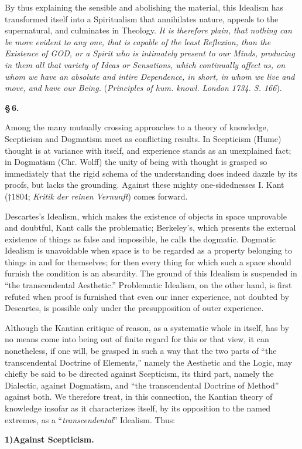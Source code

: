 \documentclass[12pt]{book}
\begin{document}
By thus explaining the sensible and abolishing the material, this Idealism has
transformed itself into a Spiritualism that annihilates nature, appeals to the
supernatural, and culminates in Theology. \textit{It is therefore plain, that
nothing can be more evident to any one, that is capable of the least Reflexion,
than the Existence of GOD, or a Spirit who is intimately present to our Minds,
producing in them all that variety of Ideas or Sensations, which continually
affect us, on whom we have an absolute and intire Dependence, in short, in whom we
live and move, and have our Being.} (\textit{Principles of hum. knowl. London
1734. S. 166}).
\begin{center}{\bfseries \S\,6.}\end{center}

Among the many mutually crossing approaches to a theory of knowledge, Scepticism
and Dogmatism meet as conflicting results. In Scepticism (Hume) thought is at
variance with itself, and experience stands as an unexplained fact; in Dogmatism
(Chr. Wolff) the unity of being with thought is grasped so immediately that the
rigid schema of the understanding does indeed dazzle by its proofs, but lacks the
grounding. Against these mighty one-sidednesses I. Kant (†1804; \textit{Kritik der
reinen Vernunft}) comes forward.

Descartes's Idealism, which makes the existence of objects in space unprovable and
doubtful, Kant calls the problematic; Berkeley's, which presents the external
existence of things as false and impossible, he calls the dogmatic. Dogmatic
Idealism is unavoidable when space is to be regarded as a property belonging to
things in and for themselves; for then every thing for which such a space should
furnish the condition is an absurdity. The ground of this Idealism is suspended in
``the transcendental Aesthetic.'' Problematic Idealism, on the other hand, is
first refuted when proof is furnished that even our inner experience, not doubted
by Descartes, is possible only under the presupposition of outer experience.

Although the Kantian critique of reason, as a systematic whole in itself, has by
no means come into being out of finite regard for this or that view, it can
nonetheless, if one will, be grasped in such a way that the two parts of ``the
transcendental Doctrine of Elements,'' namely the Aesthetic and the Logic, may
chiefly be said to be directed against Scepticism, its third part, namely the
Dialectic, against Dogmatism, and ``the transcendental Doctrine of Method''
against both. We therefore treat, in this connection, the Kantian theory of
knowledge insofar as it characterizes itself, by its opposition to the named
extremes, as a ``\emph{transcendental}'' Idealism. Thus:
\begin{center}{\bfseries 1)\quad Against Scepticism.}\end{center}
\end{document}
